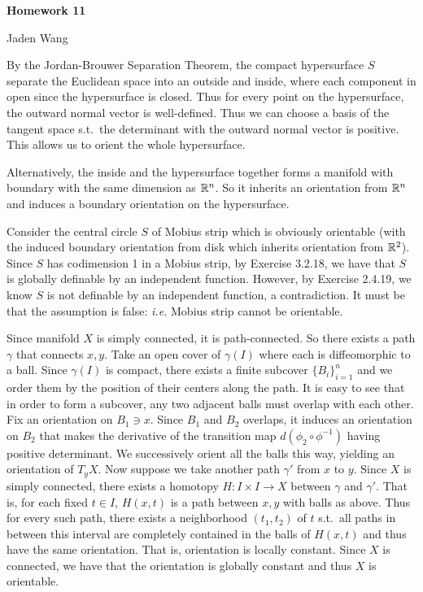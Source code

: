 \documentclass[12pt]{article}
\begin{document}
\centerline {\textsf{\textbf{\LARGE{Homework 11}}}}
\centerline {Jaden Wang}
\vspace{.15in}
\begin{problem}[3.2.13]
By the Jordan-Brouwer Separation Theorem, the compact hypersurface $ S$ separate the Euclidean space into an outside and inside, where each component in open since the hypersurface is closed. Thus for every point on the hypersurface, the outward normal vector is well-defined. Thus we can choose a basis of the tangent space s.t.\ the determinant with the outward normal vector is positive. This allows us to orient the whole hypersurface.

Alternatively, the inside and the hypersurface together forms a manifold with boundary with the same dimension as $ \mathbb{R}^{n}$. So it inherits an orientation from $ \mathbb{R}^{n}$ and induces a boundary orientation on the hypersurface.
\end{problem}
\begin{problem}[3.2.20]
Consider the central circle $ S$ of Mobius strip which is obviously orientable (with the induced boundary orientation from disk which inherits orientation from $ \mathbb{R}^2$). Since $ S$ has codimension 1 in a Mobius strip, by Exercise 3.2.18,  we have that $ S$ is globally definable by an independent function. However, by Exercise 2.4.19, we know  $ S$ is not definable by an independent function, a contradiction. It must be that the assumption is false: \emph{i.e.} Mobius strip cannot be orientable.
\end{problem}

\begin{problem}[3.2.26]
Since manifold $ X$ is simply connected, it is path-connected. So there exists a path  $ \gamma$ that connects $ x,y$. Take an open cover of  $ \gamma(I)$ where each is diffeomorphic to a ball. Since $ \gamma(I)$ is compact, there exists a finite subcover $ \{B_i\} _{i=1}^{n}$ and we order them by the position of their centers along the path. It is easy to see that in order to form a subcover, any two adjacent balls must overlap with each other. Fix an orientation on $ B_1 \ni x$. Since $ B_1$ and $ B_2$ overlaps, it induces an orientation on $ B_2$ that makes the derivative of the transition map $ d(\phi_2 \circ \phi ^{-1})$ having positive determinant. We successively orient all the balls this way, yielding an orientation of $ T_yX$. Now suppose we take another path  $ \gamma'$ from $ x$ to  $ y$. Since $ X$ is simply connected, there exists a homotopy $ H: I \times I \to X$ between $ \gamma$ and $ \gamma'$. That is, for each fixed $ t \in I$, $ H(x,t)$ is a path between $ x,y$ with balls as above. Thus for every such path, there exists a neighborhood $ (t_1,t_2)$ of $ t$ s.t.\ all paths in between this interval are completely contained in the balls of $ H(x,t)$ and thus have the same orientation. That is, orientation is locally constant. Since  $ X$ is connected, we have that the orientation is globally constant and thus  $ X$ is orientable.
\end{problem}
\end{document}
